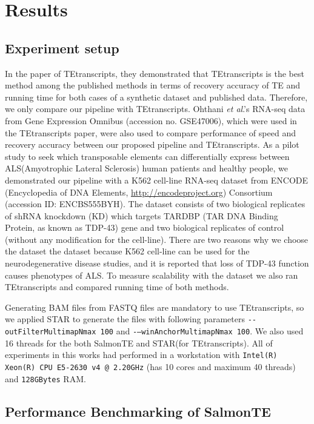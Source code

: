 \documentclass{ws-procs11x85}
\newcommand{\etal}{\textit{et al}.}
\begin{document}
\section{Results}

\subsection{Experiment setup}
In the paper of TEtranscripts, they demonstrated that TEtranscripts is the best method among the published methods in terms of recovery accuracy of TE and running time for both cases of a synthetic dataset and published data. 
Therefore, we only compare our pipeline with TEtranscripts. 
Ohthani \etal's RNA-seq data from Gene Expression Omnibus (accession no. GSE47006), which were used in the TEtranscripts paper, 
were also used to compare performance of speed and recovery accuracy between
our proposed pipeline and TEtranscripts. \cite{ohtani2013dmgtsf1}
As a pilot study to seek which transposable elements can differentially express between ALS(Amyotrophic Lateral Sclerosis) human patients and healthy people, 
we demonstrated our pipeline with a K562 cell-line RNA-seq dataset from ENCODE (Encyclopedia of DNA Elements, \url{http://encodeproject.org}) \cite{encode2012integrated} Consortium (accession ID: ENCBS555BYH). 
The dataset consists of two biological replicates of shRNA knockdown (KD)
which targets TARDBP (TAR DNA Binding Protein, as known as TDP-43) gene and two biological replicates of control 
(without any modification for the cell-line). 
There are two reasons why we choose the dataset
the dataset because K562 cell-line can be used for the neurodegenerative 
disease studies,\cite{haney2017crispr}
and it is reported that loss of TDP-43 function causes phenotypes of 
ALS.\cite{yang2014partial,mihevc2016tdp} To measure scalability with the dataset
we also ran TEtranscripts and compared running time of both methods.


Generating BAM files from FASTQ files are mandatory to use TEtranscripts, so we applied STAR\cite{dobin2013star} to generate the files with following parameters
\verb|--outFilterMultimapNmax 100| and \verb|-–winAnchorMultimapNmax 100|. We also used 16 threads for the both SalmonTE and STAR(for TEtranscripts).
All of experiments in this works had performed in a workstation with 
\verb|Intel(R) Xeon(R) CPU E5-2630 v4 @ 2.20GHz| (has 10 cores and maximum 40 threads) and \verb|128GBytes| RAM.


\subsection{Performance Benchmarking of SalmonTE}
\end{document}
